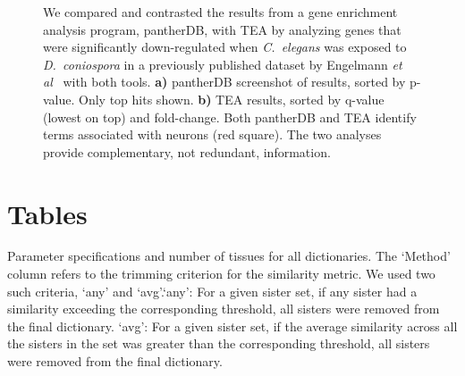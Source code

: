 \documentclass{bmcart}
\begin{document}
\begin{backmatter}
\begin{figure}[htbp]
	\captionsetup{width= 0.95\textwidth}
  	\caption{
	We compared and contrasted the results from a gene enrichment analysis program, pantherDB, with TEA by analyzing genes that were significantly down-regulated when \emph{C.~elegans} was exposed to \emph{D.~coniospora} in a previously published dataset by Engelmann \emph{et al}~\cite{Engelmann2011} with both tools. 
	\textbf{a)} pantherDB screenshot of results, sorted by p-value. Only top hits shown.
	\textbf{b)} TEA results, sorted by q-value (lowest on top) and fold-change. 
	Both pantherDB and TEA identify terms associated with neurons (red square). The two analyses provide complementary, not redundant, information.
	}
	\label{fig:Dcon}
\end{figure}



%



\section*{Tables}

\begin{table}[p]
	\caption{
	Parameter specifications and number of tissues for all dictionaries. The `Method' column refers to the trimming criterion for the similarity metric. We used two such criteria, `any' and `avg'.`any': For a given sister set, if any sister had a similarity exceeding the corresponding threshold, all sisters were removed from the final dictionary. `avg': For a given sister set, if the average similarity across all the sisters in the set was greater than the corresponding threshold, all sisters were removed from the final dictionary.
	}
	

\end{table}
\end{backmatter}
\end{document}
